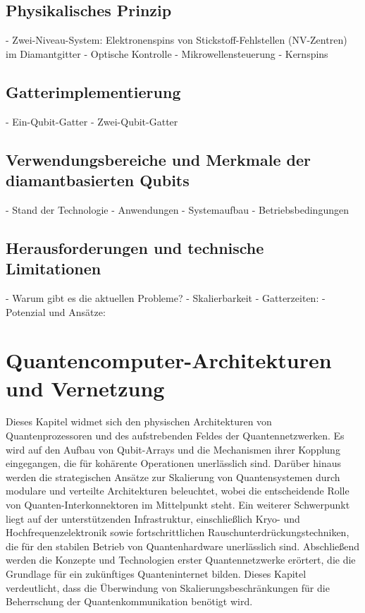 \subsection{Physikalisches Prinzip}
    - Zwei-Niveau-System: Elektronenspins von Stickstoff-Fehlstellen (NV-Zentren) im Diamantgitter
    - Optische Kontrolle
    - Mikrowellensteuerung
    - Kernspins
\subsection{Gatterimplementierung}
    - Ein-Qubit-Gatter
    - Zwei-Qubit-Gatter
\subsection{Verwendungsbereiche und Merkmale der diamantbasierten Qubits}
    - Stand der Technologie
    - Anwendungen
    - Systemaufbau
    - Betriebsbedingungen
\subsection{Herausforderungen und technische Limitationen}
    - Warum gibt es die aktuellen Probleme?
    - Skalierbarkeit
    - Gatterzeiten:
    - Potenzial und Ansätze:





\section{Quantencomputer-Architekturen und Vernetzung}
Dieses Kapitel widmet sich den physischen Architekturen von Quantenprozessoren und des aufstrebenden Feldes der Quantennetzwerken. Es wird auf den Aufbau von Qubit-Arrays und die Mechanismen ihrer Kopplung eingegangen, die für kohärente Operationen unerlässlich sind. Darüber hinaus werden die strategischen Ansätze zur Skalierung von Quantensystemen durch modulare und verteilte Architekturen beleuchtet, wobei die entscheidende Rolle von Quanten-Interkonnektoren im Mittelpunkt steht. Ein weiterer Schwerpunkt liegt auf der unterstützenden Infrastruktur, einschließlich Kryo- und Hochfrequenzelektronik sowie fortschrittlichen Rauschunterdrückungstechniken, die für den stabilen Betrieb von Quantenhardware unerlässlich sind. Abschließend werden die Konzepte und Technologien erster Quantennetzwerke erörtert, die die Grundlage für ein zukünftiges Quanteninternet bilden. Dieses Kapitel verdeutlicht, dass die Überwindung von Skalierungsbeschränkungen für die Beherrschung der Quantenkommunikation benötigt wird.
